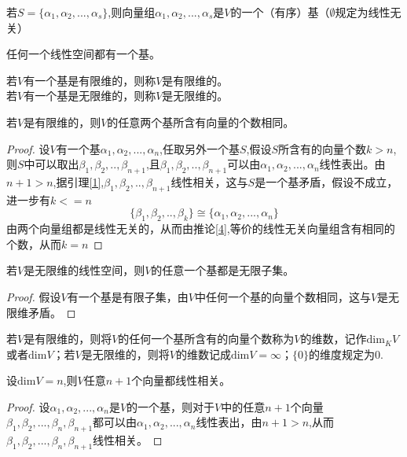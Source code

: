 \documentclass[blue,normal,cn]{elegantnote}
\begin{document}
若$S=\{α_1,α_2,...,α_s\}$,则向量组$α_1,α_2,...,α_s$是$V$的一个（有序）基（$∅$规定为线性无关）

\begin{proposition}
任何一个线性空间都有一个基。
\end{proposition}

\begin{definition}
    若$V$有一个基是有限维的，则称$V$是有限维的。\\
    若$V$有一个基是无限维的，则称$V$是无限维的。
\end{definition}

\begin{theorem}
    \label{thr_2}
    若$V$是有限维的，则$V$的任意两个基所含有向量的个数相同。
\end{theorem}

\begin{proof}
    设$V$有一个基$ α_1,α_2,...,α_n$,任取另外一个基$S$,假设$S$所含有的向量个数$k>n$,则$S$中可以取出$β_1,β_2,..,β_{n+1}$,且$β_1,β_2,..,β_{n+1}$可以由$ α_1,α_2,...,α_n$线性表出。由$n+1>n$,据引理\ref{1},$β_1,β_2,..,β_{n+1}$线性相关，这与$S$是一个基矛盾，假设不成立，进一步有$k<=n$
    \begin{equation*}
        \{β_1,β_2,..,β_{k}\} \cong \{α_1,α_2,...,α_n\}
    \end{equation*}
    由两个向量组都是线性无关的，从而由推论\ref{4},等价的线性无关向量组含有相同的个数，从而$k=n$
\end{proof}

\begin{corollary}
    若$V$是无限维的线性空间，则$V$的任意一个基都是无限子集。 
\end{corollary}

\begin{proof} 
    假设$V$有一个基是有限子集，由$V$中任何一个基的向量个数相同，这与$V$是无限维矛盾。
\end{proof}


\begin{definition}
    若$V$是有限维的，则将$V$的任何一个基所含有的向量个数称为$V$的维数，记作$\mathrm{dim}_K V$或者$\mathrm{dim} V$；若$V$是无限维的，则将$V$的维数记成$\mathrm{dim} V=∞$；$\{0\}$的维度规定为0.
\end{definition}

\begin{proposition}
    \label{12}
    设$\mathrm{dim} V=n$,则$V$任意$n+1$个向量都线性相关。
\end{proposition}

\begin{proof}
    设$α_1,α_2,...,α_n$是$V$的一个基，则对于$V$中的任意$n+1$个向量$β_1,β_2,...,β_n,β_{n+1}$都可以由$α_1,α_2,...,α_n$线性表出，由$n+1>n$,从而$β_1,β_2,...,β_n,β_{n+1}$线性相关。
\end{proof}
\end{document}
